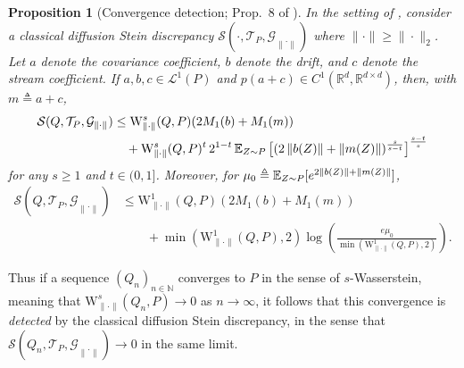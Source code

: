 \documentclass[12pt,paper=letter]{scrreprt}
\newtheorem{proposition}{Proposition}[chapter]
\def\mbb#1{\mathbb{#1}}
\def\defeq{\triangleq} %
\def\norm#1{\left\|{#1}\right\|} %
\def\E{\mbb{E}} %
\newcommand{\gset}[0]{\mathcal{G}} %
\newcommand{\steinset}[0]{\steinsetarg{}} %
\newcommand{\steinsetarg}[1]{\gset_{\norm{\cdot}_{#1}}} %
\newcommand{\pvar}[0]{z}%
\newcommand{\PVAR}[0]{\MakeUppercase{\pvar}} %
\begin{document}
\begin{proposition}[Convergence detection; Prop.~8 of \citealp{Gorham2019}] \label{prop:discrepancy-upper-bound}
In the setting of , consider a classical diffusion Stein discrepancy $\mathcal{S}(\cdot,\mathcal{T}_P,\steinset)$ where $\|\cdot\| \geq \| \cdot \|_2$.
Let $a$ denote the covariance coefficient, $b$ denote the drift, and $c$ denote the stream coefficient.
If $a, b, c \in \mathcal{L}^1(P)$ and $p(a+c) \in C^1(\mathbb{R}^d,\mathbb{R}^{d \times d})$, then, with $m \defeq  a + c$,
\begin{align*}
	\mathcal{S}(Q,\mathcal{T}_P,\steinset)
		& \leq \mathrm{W}_{\|\cdot\|}^s (Q,P) (2M_1(b)+M_1(m)) \\
		& \quad + \mathrm{W}_{\|\cdot\|}^s(Q,P)^t\, 2^{1-t}\, \E_{Z \sim P} \left[ {(2\norm{b(\PVAR)} + \norm{m(\PVAR)})^{\frac{s}{s-t}}} \right]^{\frac{s-t}{s}}
\end{align*}
for any $s\geq 1$ and $t \in (0,1]$.
Moreover, for $\mu_0 \defeq \mathbb{E}_{Z \sim P} [ e^{2\norm{b(\PVAR)}+\norm{m(\PVAR)}} ]$,
\begin{align*}
\mathcal{S}(Q,\mathcal{T}_P,\steinset) &\le
\mathrm{W}_{\|\cdot\|}^1(Q,P) (2M_1(b)+M_1(m)) \\
& \qquad + \min( \mathrm{W}_{\|\cdot\|}^1(Q,P), 2) \log\left( \frac{e\mu_0}{\min( \mathrm{W}_{\|\cdot\|}^1(Q,P), 2)} \right).
\end{align*}
\end{proposition}

\noindent Thus if a sequence $(Q_n)_{n \in \mathbb{N}}$ converges to $P$ in the sense of $s$-Wasserstein, meaning that $\mathrm{W}_{\|\cdot\|}^s(Q_n,P) \rightarrow 0$ as $n \rightarrow \infty$, it follows that this convergence is \emph{detected} by the classical diffusion Stein discrepancy, in the sense that $\mathcal{S}(Q_n,\mathcal{T}_P,\steinset) \rightarrow 0$ in the same limit.
\end{document}
